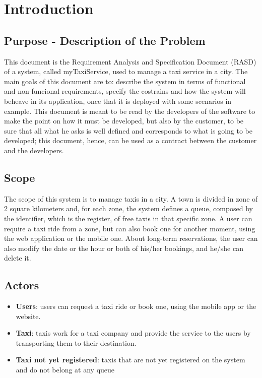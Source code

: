 \section{Introduction}
	\subsection{Purpose - Description of the Problem}
	This document is the Requirement Analysis and Specification Document (RASD) of a system, called myTaxiService, used to manage a taxi service in a city. The main goals of this document are to: describe the system in terms of functional and non-funcional requirements, specify the costrains and how the system will beheave in its application, once that it is deployed with some scenarios in example. This document is meant to be read by the developers of the software to make the point on how it must be developed, but also by the customer, to be sure that all what he asks is well defined and corresponds to what is going to be developed; this document, hence, can be used as a contract between the customer and the developers.
		
	\subsection{Scope}
	The scope of this system is to manage taxis in a city. A town is divided in zone of 2 square kilometers and, for each zone, the system defines a queue, composed by the identifier, which is the register, of free taxis in that specific zone. A user can require a taxi ride from a zone, but can also book one for another moment, using the web application or the mobile one. About long-term reservations, the user can also modify the date or the hour or both of his/her bookings, and he/she can delete it. 
	
	\subsection{Actors}
	\begin{itemize}
		\item \textbf{Users}: users can request a taxi ride or book one, using the mobile app or the website.
		\item \textbf{Taxi}: taxis work for a taxi company and provide the service to the users by transporting them to their destination.
		\item \textbf{Taxi not yet registered}: taxis that are not yet registered on the system and do not belong at any queue
	\end{itemize}
	

